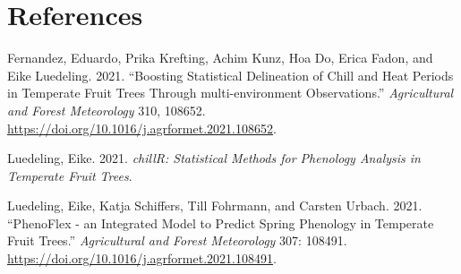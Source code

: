 \documentclass[
]{article}
\newlength{\cslhangindent}
\newlength{\cslentryspacingunit} %
\newenvironment{CSLReferences}[2] %
 {%
  \setlength{\parindent}{0pt}
  \ifodd #1
  \let\oldpar\par
  \def\par{\hangindent=\cslhangindent\oldpar}
  \fi
  \setlength{\parskip}{#2\cslentryspacingunit}
 }%
 {}
\begin{document}
\newpage

\hypertarget{references}{%
\section*{References}\label{references}}

\hypertarget{refs}{}
\begin{CSLReferences}{1}{0}
\leavevmode{}%
Fernandez, Eduardo, Prika Krefting, Achim Kunz, Hoa Do, Erica Fadon, and
Eike Luedeling. 2021. {``Boosting Statistical Delineation of Chill and
Heat Periods in Temperate Fruit Trees Through {multi-environment}
Observations.''} \emph{Agricultural and Forest Meteorology} 310, 108652.
\url{https://doi.org/10.1016/j.agrformet.2021.108652}.

\leavevmode{}%
Luedeling, Eike. 2021. \emph{chillR: Statistical Methods for Phenology
Analysis in Temperate Fruit Trees}.

\leavevmode{}%
Luedeling, Eike, Katja Schiffers, Till Fohrmann, and Carsten Urbach.
2021. {``PhenoFlex - an Integrated Model to Predict Spring Phenology in
Temperate Fruit Trees.''} \emph{Agricultural and Forest Meteorology}
307: 108491. \url{https://doi.org/10.1016/j.agrformet.2021.108491}.

\end{CSLReferences}
\end{document}
